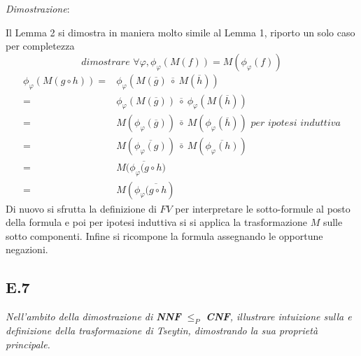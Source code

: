 \documentclass[a4paper]{article}
\newenvironment{dimostrazione}{\textit{Dimostrazione}:\begin{adjustwidth}{1cm}{}}{\end{adjustwidth}}
\begin{document}
\begin{dimostrazione}
	Il Lemma 2 si dimostra in maniera molto simile al Lemma 1, riporto un solo caso per completezza
	$$\textit{dimostrare } \forall \varphi, \phi_\varphi(M(f)) = M(\phi_\varphi(f)) $$
	\begin{align*}
                        \phi_\varphi(M(g \circ h)) =& \phi_\varphi(M(\overline g) \: \overline \circ \: M(\overline h))\\
			=& \phi_\varphi(M(\overline g)) \: \overline \circ \: \phi_\varphi(M(\overline h))\\
			=& M(\phi_\varphi(\overline g)) \: \overline \circ \: M(\phi_\varphi(\overline h)) \textit{  per ipotesi induttiva}\\
			=& M(\overline{\phi_\varphi(g)}) \: \overline \circ \: M(\overline{\phi_\varphi(h)})\\
			=& M\overline{(\phi_\varphi (g \circ h})\\
			=& M(\phi_\varphi \overline{(g \circ h})
                \end{align*}
	Di nuovo si sfrutta la definizione di $FV$ per interpretare le sotto-formule al posto della formula e poi per ipotesi induttiva si si applica la trasformazione $M$ sulle sotto componenti.
	Infine si ricompone la formula assegnando le opportune negazioni.
\end{dimostrazione}
\subsection{E.7}
\emph{Nell’ambito della dimostrazione di \textbf{NNF} $\leq_P$ \textbf{CNF}, illustrare intuizione sulla e definizione della trasformazione di Tseytin, dimostrando la sua proprietà principale.}
\end{document}
